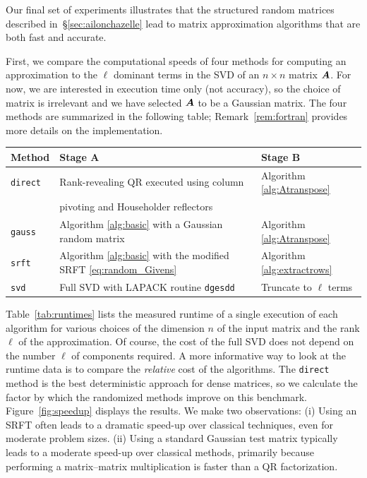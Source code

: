 \documentclass[final]{siamltex}
\newcounter{algorithm}[section]
\begin{document}
Our final set of experiments illustrates that the structured random matrices
described in~\S\ref{sec:ailonchazelle} lead to matrix approximation algorithms
that are both fast and accurate.

First, we compare the computational speeds of four methods for computing an
approximation to the $\ell$ dominant terms in the SVD of an $n \times n$ matrix $\bm{A}$.
For now, we are interested in execution time only (not accuracy), so the
choice of matrix is irrelevant and we have selected $\bm{A}$ to be a Gaussian matrix.
The four methods are summarized in the following table; Remark~\ref{rem:fortran}
provides more details on the implementation.

\lsp

\begin{center}
\renewcommand{\arraystretch}{1.2}
\begin{tabular}{|l||l|l|}
\hline
\textbf{Method} & \textbf{Stage A} & \textbf{Stage B} \\
\hline \hline
\texttt{direct} & Rank-revealing QR executed using column & Algorithm \ref{alg:Atranspose} \\
          & pivoting and Householder reflectors & \\ \hline
\texttt{gauss} & Algorithm \ref{alg:basic} with a Gaussian random matrix & Algorithm \ref{alg:Atranspose}\\ \hline
\texttt{srft} & Algorithm \ref{alg:basic} with the modified SRFT \eqref{eq:random_Givens} & Algorithm \ref{alg:extractrows} \\
\hline
\texttt{svd} & %
Full SVD with LAPACK routine {\tt dgesdd} & Truncate to $\ell$ terms \\
\hline
\end{tabular}
\end{center}

\lsp


Table~\ref{tab:runtimes} lists the measured runtime of a single execution
of each algorithm for various choices of the dimension $n$ of the input
matrix and the rank $\ell$ of the approximation.  Of course, the cost of
the full SVD does not depend on the number $\ell$ of components required.
A more informative way to look at the runtime data is to compare the
\emph{relative} cost of the algorithms.  The {\tt direct} method is
the best deterministic approach for dense matrices, so we calculate
the factor by which the randomized methods improve on this benchmark.
Figure~\ref{fig:speedup} displays the results.
We make two observations:
(i) Using an SRFT often leads to a dramatic
speed-up over classical techniques, even for moderate problem sizes.
(ii) Using a standard Gaussian test matrix typically leads to a moderate
speed-up over classical methods, primarily because performing a
matrix--matrix multiplication is faster than a QR factorization.
\end{document}

